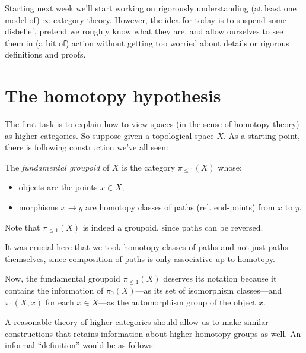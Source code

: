 \begin{remark}
  \label{intro-disbelief}
  Starting next week we'll start working on rigorously understanding (at least one model of) $\infty$-category theory. However, the idea for today is to suspend some disbelief, pretend we roughly know what they are, and allow ourselves to see them in (a bit of) action without getting too worried about details or rigorous definitions and proofs.
\end{remark}


\section{The homotopy hypothesis}
\label{gpd}

The first task is to explain how to view spaces (in the sense of homotopy theory) as higher categories. So suppose given a topological space $X$. As a starting point, there is following construction we've all seen:

\begin{definition}
  \label{gpd-fundamental}
  The \emph{fundamental groupoid} of $X$ is the category $\pi_{\le 1}(X)$ whose:
  \begin{itemize}
  \item objects are the points $x \in X$;
  \item morphisms $x \to y$ are homotopy classes of paths (rel. end-points) from $x$ to $y$.
  \end{itemize}
  Note that $\pi_{\le 1}(X)$ is indeed a groupoid, since paths can be reversed.

  \begin{subremark}
    \label{gpd-fundamental-assoc}
    It was crucial here that we took homotopy classes of paths and not just paths themselves, since composition of paths is only associative up to homotopy.
  \end{subremark}
\end{definition}

Now, the fundamental groupoid $\pi_{\le 1}(X)$ deserves its notation because it contains the information of $\pi_0(X)$---as its set of isomorphism classes---and $\pi_1(X,x)$ for each $x \in X$---as the automorphism group of the object $x$.

A reasonable theory of higher categories should allow us to make similar constructions that retains information about higher homotopy groups as well. An informal ``definition'' would be as follows:

